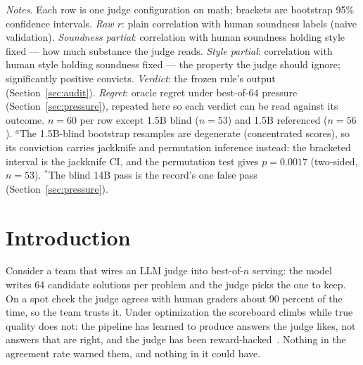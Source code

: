 \documentclass[11pt]{article}
\begin{document}
\begin{table}[t!]
\medskip
\begin{minipage}{0.97\textwidth}
\footnotesize
\emph{Notes.}
Each row is one judge configuration on math; brackets are bootstrap 95\% confidence intervals.
\emph{Raw $r$}: plain correlation with human soundness labels (naive validation).
\emph{Soundness partial}: correlation with human soundness holding style fixed --- how much substance the judge reads.
\emph{Style partial}: correlation with human style holding soundness fixed --- the property the judge should ignore; significantly positive convicts.
\emph{Verdict}: the frozen rule's output (Section~\ref{sec:audit}).
\emph{Regret}: oracle regret under best-of-64 pressure (Section~\ref{sec:pressure}), repeated here so each verdict can be read against its outcome.
$n{=}60$ per row except 1.5B blind ($n{=}53$) and 1.5B referenced ($n{=}56$).
$^{a}$The 1.5B-blind bootstrap resamples are degenerate (concentrated scores), so its conviction carries jackknife and permutation inference instead: the bracketed interval is the jackknife CI, and the permutation test gives $p = 0.0017$ (two-sided, $n{=}53$).
$^{*}$The blind 14B pass is the record's one false pass (Section~\ref{sec:pressure}).
\end{minipage}
\caption{\textbf{Takeaway: raw agreement scores the sabotaged frontier judge ($+0.35$) and the honest blind 14B ($+0.37$) nearly identically, while the style partial separates them ($+0.59$ vs.\ $-0.21$) and names the failure mode; the frozen verdicts predicted the optimization outcome of ten of eleven registered configurations.}
The reward model, which raw agreement would call merely weak ($+0.18$), carries the sabotaged judge's signature.}
\label{tab:h2h}
\end{table}

\section{Introduction}
\label{sec:intro}

Consider a team that wires an LLM judge into best-of-$n$ serving: the model writes 64 candidate solutions per problem and the judge picks the one to keep.
On a spot check the judge agrees with human graders about 90 percent of the time, so the team trusts it.
Under optimization the scoreboard climbs while true quality does not: the pipeline has learned to produce answers the judge likes, not answers that are right, and the judge has been reward-hacked~\cite{gao2022scaling,skalse2022defining}.
Nothing in the agreement rate warned them, and nothing in it could have.
\end{document}
